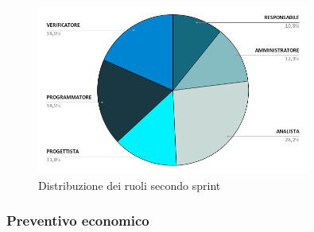 {
\begin{figure}[h!]
    \centering
    \includegraphics[width=0.8\textwidth]{prev2ruoli.png}
    \caption{Distribuzione dei ruoli secondo sprint}
    \label{fig:preventivootariosecondosprint}
\end{figure}
}

\newpage
\subsubsection{Preventivo economico}

